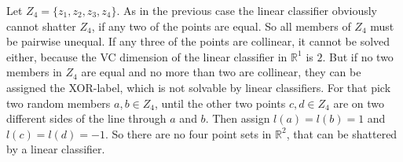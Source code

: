 \documentclass[10pt,a4paper]{article}
\begin{document}
Let $Z_4 = \{ z_1, z_2, z_3, z_4 \}$. As in the previous case the linear
classifier obviously cannot shatter $Z_4$, if any two of the points are
equal. So all members of $Z_4$ must be pairwise unequal. If any three of the
points are collinear, it cannot be solved either, because the VC dimension of
the linear classifier in $\mathbb{R}^{1}$ is $2$. But if no two members in $Z_4$
are equal and no more than two are collinear, they can be assigned the
XOR-label, which is not solvable by linear classifiers. For that pick two random
members $a, b \in Z_4$, until the other two points $c, d \in Z_4$ are on two
different sides of the line through $a$ and $b$. Then assign $l(a) = l(b) = 1$
and $l(c) = l(d) = -1$. So there are no four point sets in $\mathbb{R}^{2}$,
that can be shattered by a linear classifier.
\end{document}
